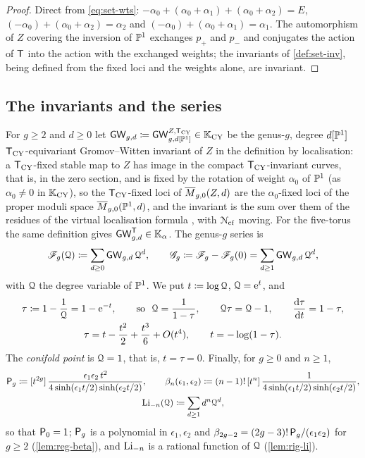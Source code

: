 \begin{proof}
Direct from \eqref{eq:set-wts}: $-\alpha_0+(\alpha_0+\alpha_1)+(\alpha_0+\alpha_2)=E$, $(-\alpha_0)+(\alpha_0+\alpha_2)=\alpha_2$ and $(-\alpha_0)+(\alpha_0+\alpha_1)=\alpha_1$. The automorphism of $Z$ covering the inversion of $\mathbb{P}^1$ exchanges $p_+$ and $p_-$ and conjugates the action of $\mathsf{T}$ into the action with the exchanged weights; the invariants of \cref{def:set-inv}, being defined from the fixed loci and the weights alone, are invariant.
\end{proof}

\subsection{The invariants and the series}
\label{sec:set-inv}

\begin{defn}
\label{def:set-inv}
For $g\geq2$ and $d\geq0$ let $\mathsf{GW}_{g,d}\coloneqq\mathsf{GW}^{Z,\mathsf{T}_{\mathrm{CY}}}_{g,d[\mathbb{P}^1]}\in\mathbb{K}_{\mathrm{CY}}$ be the genus-$g$, degree $d[\mathbb{P}^1]$ $\mathsf{T}_{\mathrm{CY}}$-equivariant Gromov--Witten invariant of $Z$ in the definition by localisation: a $\mathsf{T}_{\mathrm{CY}}$-fixed stable map to $Z$ has image in the compact $\mathsf{T}_{\mathrm{CY}}$-invariant curves, that is, in the zero section, and is fixed by the rotation of weight $\alpha_0$ of $\mathbb{P}^1$ (as $\alpha_0\neq0$ in $\mathbb{K}_{\mathrm{CY}}$), so the $\mathsf{T}_{\mathrm{CY}}$-fixed loci of $\overline{M}_{g,0}(Z,d)$ are the $\alpha_0$-fixed loci of the proper moduli space $\overline{M}_{g,0}(\mathbb{P}^1,d)$, and the invariant is the sum over them of the residues of the virtual localisation formula \cite{GP99}, with $\mathcal{N}_{\mathrm{cf}}$ moving.  For the five-torus the same definition gives $\mathsf{GW}^{\mathsf{T}}_{g,d}\in\mathbb{K}_{\alpha}$. The genus-$g$ series is
\[
\mathscr{F}_g(\mathcal{Q})\coloneqq\sum_{d\geq0}\mathsf{GW}_{g,d}\,\mathcal{Q}^d,\qquad \mathscr{G}_g\coloneqq\mathscr{F}_g-\mathscr{F}_g(0)=\sum_{d\geq1}\mathsf{GW}_{g,d}\,\mathcal{Q}^d ,
\]
with $\mathcal{Q}$ the degree variable of $\mathbb{P}^1$. We put $t\coloneqq\log\mathcal{Q}$, $\mathcal{Q}=\mathrm{e}^{t}$, and
\[
\begin{gathered}
\tau\coloneqq1-\frac1\cQ=1-\re^{-t},\qquad\text{so }\ \cQ=\frac1{1-\tau},\qquad \cQ\tau=\cQ-1,\qquad \frac{\dd\tau}{\dd t}=1-\tau,\\
\tau=t-\frac{t^2}2+\frac{t^3}6+O(t^4),\qquad t=-\log(1-\tau).
\end{gathered}
\]
The \emph{conifold point} is $\mathcal{Q}=1$, that is, $t=\tau=0$. Finally, for $g\geq0$ and $n\geq1$,
\[
\begin{gathered}
\mathsf{P}_{g}\coloneqq[t^{2g}]\,\frac{\epsilon_1\epsilon_2\,t^2}{4\sinh(\epsilon_1t/2)\sinh(\epsilon_2t/2)},\qquad
\beta_n(\epsilon_1,\epsilon_2)\coloneqq(n-1)!\,[t^n]\,\frac{1}{4\sinh(\epsilon_1t/2)\sinh(\epsilon_2t/2)},\\
\operatorname{Li}_{-n}(\mathcal{Q})\coloneqq\sum_{d\geq1}d^n\mathcal{Q}^d ,
\end{gathered}
\]
so that $\mathsf{P}_{0}=1$; $\mathsf{P}_{g}$ is a polynomial in $\epsilon_1,\epsilon_2$ and $\beta_{2g-2}=(2g-3)!\,\mathsf{P}_{g}/(\epsilon_1\epsilon_2)$ for $g\geq2$ (\cref{lem:reg-beta}), and $\operatorname{Li}_{-n}$ is a rational function of $\mathcal{Q}$ (\cref{lem:rig-li}).
\end{defn}

